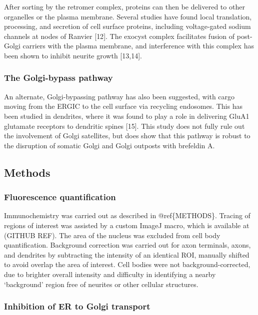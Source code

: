 \documentclass[
  12pt,
  a4paper,
]{article}
\begin{document}
After sorting by the retromer complex, proteins can then be delivered to
other organelles or the plasma membrane. Several studies have found
local translation, processing, and secretion of cell surface proteins,
including voltage-gated sodium channels at nodes of Ranvier {[}12{]}.
The exocyst complex facilitates fusion of post-Golgi carriers with the
plasma membrane, and interference with this complex has been shown to
inhibit neurite growth {[}13,14{]}.

\hypertarget{the-golgi-bypass-pathway}{%
\subsubsection{The Golgi-bypass
pathway}\label{the-golgi-bypass-pathway}}

An alternate, Golgi-bypassing pathway has also been suggested, with
cargo moving from the ERGIC to the cell surface via recycling endosomes.
This has been studied in dendrites, where it was found to play a role in
delivering GluA1 glutamate receptors to dendritic spines {[}15{]}. This
study does not fully rule out the involvement of Golgi satellites, but
does show that this pathway is robust to the disruption of somatic Golgi
and Golgi outposts with brefeldin A.

\hypertarget{methods}{%
\subsection{Methods}\label{methods}}

\hypertarget{fluorescence-quantification}{%
\subsubsection{Fluorescence
quantification}\label{fluorescence-quantification}}

Immunochemistry was carried out as described in @ref\{METHODS\}. Tracing
of regions of interest was assisted by a custom ImageJ macro, which is
available at (GITHUB REF). The area of the nucleus was excluded from
cell body quantification. Background correction was carried out for axon
terminals, axons, and dendrites by subtracting the intensity of an
identical ROI, manually shifted to avoid overlap the area of interest.
Cell bodies were not background-corrected, due to brighter overall
intensity and difficulty in identifying a nearby `background' region
free of neurites or other cellular structures.

\hypertarget{inhibition-of-er-to-golgi-transport}{%
\subsubsection{Inhibition of ER to Golgi
transport}\label{inhibition-of-er-to-golgi-transport}}
\end{document}
